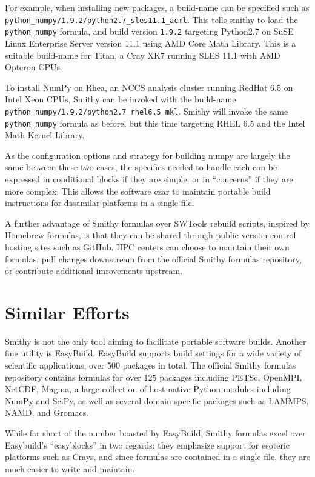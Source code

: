 \documentclass{acm_proc_article-sp}
\begin{document}
For example, when installing new packages, a build-name can be specified such as \texttt{python\_numpy/1.9.2/python2.7\_sles11.1\_acml}. This tells smithy to load the \texttt{python\_numpy} formula, and build version \texttt{1.9.2} targeting Python2.7 on SuSE Linux Enterprise Server version 11.1 using AMD Core Math Library. This is a suitable build-name for Titan, a Cray XK7 running SLES 11.1 with AMD Opteron CPUs.

To install NumPy on Rhea, an NCCS analysis cluster running RedHat 6.5 on Intel Xeon CPUs, Smithy can be invoked with the build-name \texttt{python\_numpy/1.9.2/python2.7\_rhel6.5\_mkl}. Smithy will invoke the same \texttt{python\_numpy} formula as before, but this time targeting RHEL 6.5 and the Intel Math Kernel Library. 

As the configuration options and strategy for building numpy are largely the same between these two cases, the specifics needed to handle each can be expressed in conditional blocks if they are simple, or in ``concerns'' if they are more complex. This allows the software czar to maintain portable build instructions for dissimilar platforms in a single file.

A further advantage of Smithy formulas over SWTools rebuild scripts, inspired by Homebrew formulas, is that they can be shared through public version-control hosting sites such as GitHub. HPC centers can choose to maintain their own formulas, pull changes downstream from the official Smithy formulas repository, or contribute additional imrovements upstream. 

\section{Similar Efforts}

Smithy is not the only tool aiming to facilitate portable software builds. Another fine utility is EasyBuild\cite{EasyBuild}. EasyBuild supports build settings for a wide variety of scientific applications, over 500 packages in total. The official Smithy formulas repository contains formulas for over 125 packages including PETSc, OpenMPI, NetCDF, Magma, a large collection of host-native Python modules including NumPy and SciPy, as well as several domain-specific packages such as LAMMPS, NAMD, and Gromacs. 

While far short of the number boasted by EasyBuild, Smithy formulas excel over Easybuild's ``easyblocks'' in two regards: they emphasize support for esoteric platforms such as Crays, and since formulas are contained in a single file, they are much easier to write and maintain.
\end{document}
